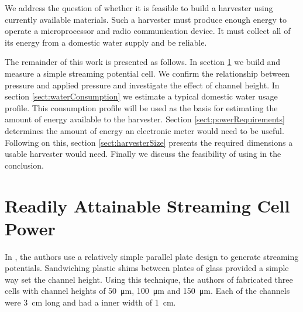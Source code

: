 \documentclass[10pt,final,journal]{IEEEtran}
\begin{document}
    We address the question of whether it is feasible to build a harvester using currently available materials.
    Such a harvester must produce enough energy to operate a microprocessor and radio communication device.
    It must collect all of its energy from a domestic water supply and be reliable.

    The remainder of this work is presented as follows.
    In section \ref{sect:streamingCell} we build and measure a simple streaming potential cell.
    We confirm the relationship between pressure and applied pressure and investigate the effect of channel height.
    In section \ref{sect:waterConsumption} we estimate a typical domestic water usage profile.
    This consumption profile will be used as the basis for estimating the amount of energy available to the harvester.
    Section \ref{sect:powerRequirements} determines the amount of energy an electronic meter would need to be useful.
    Following on this, section \ref{sect:harvesterSize} presents the required dimensions a usable harvester would need.
    Finally we discuss the feasibility of using  in the conclusion.

    \section{Readily Attainable Streaming Cell Power} \label{sect:streamingCell}
    In \cite{Gu2000}, the authors use a relatively simple parallel plate design to generate streaming potentials.
    Sandwiching plastic shims between plates of glass provided a simple way set the channel height.
    Using this technique, the authors of \cite{Gu2000} fabricated three cells with channel heights of \SI{50}{\micro\metre}, \SI{100}{\micro\metre} and \SI{150}{\micro\metre}.
    Each of the channels were \SI{3}{\centi\metre} long and had a inner width of \SI{1}{\centi\metre}.
\end{document}
